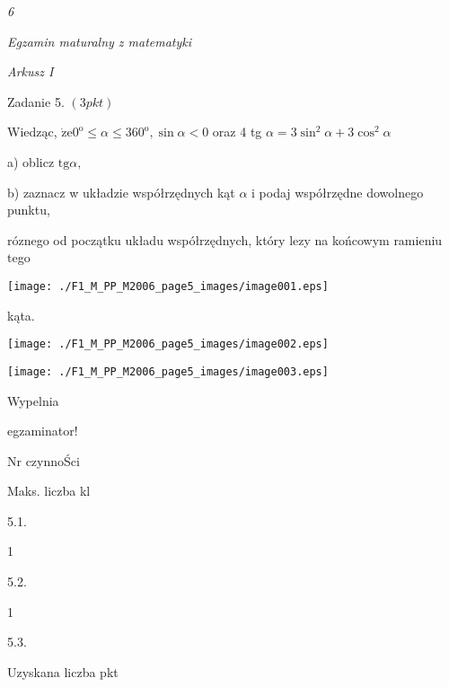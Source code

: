 \documentclass[a4paper,12pt]{article}
\begin{document}
{\it 6}

{\it Egzamin maturalny z matematyki}

{\it Arkusz I}

Zadanie 5. $(3pkt)$

Wiedząc, $\dot{\mathrm{z}}\mathrm{e}0^{\mathrm{o}}\leq\alpha\leq 360^{\mathrm{o}}, \sin\alpha<0$ oraz 4 tg $\alpha=3\sin^{2}\alpha+3\cos^{2}\alpha$

a) oblicz $\mathrm{t}\mathrm{g}\alpha,$

b) zaznacz w układzie współrzędnych kąt $\alpha$ i podaj współrzędne dowolnego punktu,

róznego od początku układu współrzędnych, który lezy na końcowym ramieniu tego
\begin{center}
\texttt{[image: ./F1\_M\_PP\_M2006\_page5\_images/image001.eps]}
\end{center}
kąta.
\begin{center}
\texttt{[image: ./F1\_M\_PP\_M2006\_page5\_images/image002.eps]}

\texttt{[image: ./F1\_M\_PP\_M2006\_page5\_images/image003.eps]}
\end{center}
Wypelnia

egzaminator!

Nr czynnoŚci

Maks. liczba kl

5.1.

1

5.2.

1

5.3.

Uzyskana liczba pkt
\end{document}
